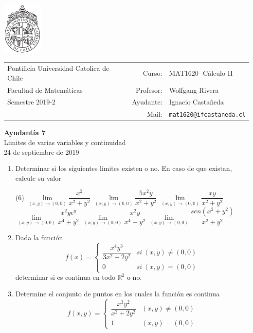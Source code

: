 \documentclass[12pt]{article}
\makeatletter
\newenvironment{preguntas}
{\begin{enumerate}\itemsep12pt
	}
	{
	\end{enumerate}
}
\newcommand{\ayudantia}{{\sc Ayudantía 7}}
\newcommand{\tituloayu}{Limites de varias variables y continuidad}
\newcommand{\fecha}{24 de septiembre de 2019}
\newcommand{\sigla}{MAT1620}
\newcommand{\nombre}{Cálculo II}
\newcommand{\profesor}{Wolfgang Rivera}
\newcommand{\ano}{2019}
\newcommand{\semestre}{2}
\newcommand{\mail}{mat1620@ifcastaneda.cl}
\newcommand{\R}{\mathbb{R}}
\makeatother
\begin{document}
\thispagestyle{empty}

\begin{minipage}{2cm}
	\includegraphics[width=2cm]{../../../../img/logo.pdf}
	\vspace{0.5cm}
\end{minipage}
\begin{minipage}{\linewidth}
	\begin{tabular}{lrl}
		{\scriptsize\sc Pontificia Universidad Catolica de Chile} & \hspace*{0.7in}Curso: &
		\sigla  - \nombre\\
		{\sc Facultad de Matemáticas}&
		Profesor: & \profesor \\
		{\sc Semestre \ano-\semestre} & Ayudante: & {Ignacio Castañeda}\\
		& {Mail:} & \texttt{\mail}
	\end{tabular}
\end{minipage}

\vspace{-10mm}
\begin{center}
	{\LARGE\bf \ayudantia}\\
	\vspace{0.1cm}
	{\tituloayu}\\
	\vspace{0.1cm}
	\fecha\\
	\vspace{0.4cm}
\end{center}

\begin{preguntas}
\item Determinar si los siguientes limites existen o no. En caso de que existan, calcule su valor
\begin{tasks}(6)
\task $\lim\limits_{(x,y) \to (0,0)} \dfrac{x^2}{x^2+y^2}$
\task $\lim\limits_{(x,y) \to (0,0)} \dfrac{5x^2y}{x^2+y^2}$
\task $\lim\limits_{(x,y) \to (0,0)} \dfrac{xy}{x^2+y^2}$
\task $\lim\limits_{(x,y) \to (0,0)} \dfrac{x^2ye^y}{x^4+y^2}$
\task $\lim\limits_{(x,y) \to (0,0)} \dfrac{x^2y}{x^4+y^2}$
\task $\lim\limits_{(x,y) \to (0,0)} \dfrac{sen(x^2+y^2)}{x^2+y^2}$
\end{tasks}
\item Dada la función 
	$$ f(x) = 
	\begin{cases}
	\dfrac{x^4y^3}{3x^2+2y^2} & si\ (x,y) \neq (0,0) \\
	0 & si\ (x,y) = (0,0)
	\end{cases}
	$$
	determinar si es continua en todo $\R^2$ o no.
\item Determine el conjunto de puntos en los cuales la función es continua
	$$f(x,y) = 
	\begin{cases}
	\dfrac{x^3y^2}{x^2+2y^2} & (x,y) \neq (0,0)\\
	1 & (x,y) = (0,0)
	\end{cases}
	$$
\end{preguntas}
\end{document}
